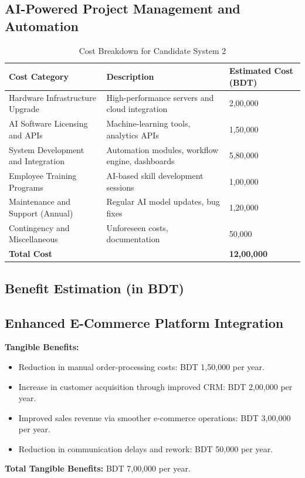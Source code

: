 \documentclass[12pt,a4paper]{article}
\begin{document}
\subsection*{AI-Powered Project Management and Automation}

\begin{table}[H]
\centering
\renewcommand{\arraystretch}{1.2}
\begin{tabular}{|p{5cm}|p{5cm}|p{5cm}|}
\hline
\rowcolor{tableheader}
\textcolor{headertext}{\textbf{Cost Category}} & 
\textcolor{headertext}{\textbf{Description}} & 
\textcolor{headertext}{\textbf{Estimated Cost (BDT)}} \\ \hline
Hardware Infrastructure Upgrade & High-performance servers and cloud integration & 2,00,000 \\ \hline
AI Software Licensing and APIs & Machine-learning tools, analytics APIs & 1,50,000 \\ \hline
System Development and Integration & Automation modules, workflow engine, dashboards & 5,80,000 \\ \hline
Employee Training Programs & AI-based skill development sessions & 1,00,000 \\ \hline
Maintenance and Support (Annual) & Regular AI model updates, bug fixes & 1,20,000 \\ \hline
Contingency and Miscellaneous & Unforeseen costs, documentation & 50,000 \\ \hline
\textbf{Total Cost} &  & \textbf{12,00,000} \\ \hline
\end{tabular}
\caption{Cost Breakdown for Candidate System 2}
\end{table}

\subsection{Benefit Estimation (in BDT)}

\subsection*{Enhanced E-Commerce Platform Integration}
\textbf{Tangible Benefits:}
\begin{itemize}
    \item Reduction in manual order-processing costs: BDT 1,50,000 per year.
    \item Increase in customer acquisition through improved CRM: BDT 2,00,000 per year.
    \item Improved sales revenue via smoother e-commerce operations: BDT 3,00,000 per year.
    \item Reduction in communication delays and rework: BDT 50,000 per year.
\end{itemize}
\vspace{0.5cm}
\textbf{Total Tangible Benefits:} BDT 7,00,000 per year.
\end{document}
